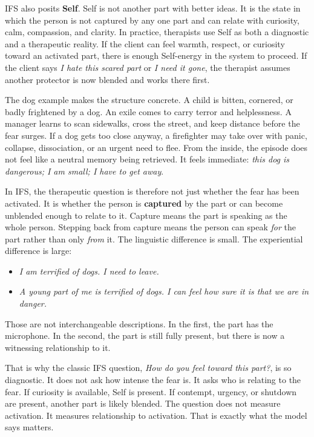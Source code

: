 \documentclass[12pt,a4paper]{article}
\providecommand{\tightlist}{%
  \setlength{\itemsep}{0pt}\setlength{\parskip}{0pt}}
\begin{document}
IFS also posits \textbf{Self}. Self is not another part with better
ideas. It is the state in which the person is not captured by any one
part and can relate with curiosity, calm, compassion, and clarity. In
practice, therapists use Self as both a diagnostic and a therapeutic
reality. If the client can feel warmth, respect, or curiosity toward an
activated part, there is enough Self-energy in the system to proceed. If
the client says \emph{I hate this scared part} or \emph{I need it gone},
the therapist assumes another protector is now blended and works there
first.

The dog example makes the structure concrete. A child is bitten,
cornered, or badly frightened by a dog. An exile comes to carry terror
and helplessness. A manager learns to scan sidewalks, cross the street,
and keep distance before the fear surges. If a dog gets too close
anyway, a firefighter may take over with panic, collapse, dissociation,
or an urgent need to flee. From the inside, the episode does not feel
like a neutral memory being retrieved. It feels immediate: \emph{this
dog is dangerous; I am small; I have to get away}.

In IFS, the therapeutic question is therefore not just whether the fear
has been activated. It is whether the person is \textbf{captured} by the
part or can become unblended enough to relate to it. Capture means the
part is speaking as the whole person. Stepping back from capture means
the person can speak \emph{for} the part rather than only \emph{from}
it. The linguistic difference is small. The experiential difference is
large:

\begin{itemize}
\tightlist
\item
  \emph{I am terrified of dogs. I need to leave.}
\item
  \emph{A young part of me is terrified of dogs. I can feel how sure it
  is that we are in danger.}
\end{itemize}

Those are not interchangeable descriptions. In the first, the part has
the microphone. In the second, the part is still fully present, but
there is now a witnessing relationship to it.

That is why the classic IFS question, \emph{How do you feel toward this
part?}, is so diagnostic. It does not ask how intense the fear is. It
asks who is relating to the fear. If curiosity is available, Self is
present. If contempt, urgency, or shutdown are present, another part is
likely blended. The question does not measure activation. It measures
relationship to activation. That is exactly what the model says matters.
\end{document}

